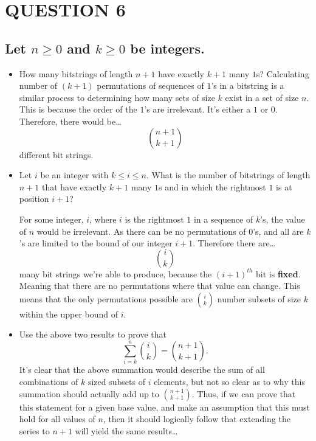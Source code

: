 \documentclass{amsart}
\theoremstyle{definition}
\theoremstyle{remark}
\numberwithin{equation}{section}
\begin{document}
\section*{QUESTION 6}
\subsection*{
Let $n \geq 0$ and $k \geq 0$ be integers. 
}
\begin{itemize} 
\item How many bitstrings of length $n+1$ have exactly $k+1$ many $1$s? \newline\newline 
	Calculating number of $(k+1)$ permutations of sequences of $1$'s in a bitstring is a similar process to determining how many sets of size $k$ exist in a set of size $n$. 
	This is because the order of the $1$'s are irrelevant. It's either a $1$ or $0$. Therefore, there would be\dots\newline $${n+1}\choose {k+1}$$ different bit strings.\newline
\item Let $i$ be an integer with $k \leq i \leq n$.  
      What is the number of bitstrings of length $n+1$ that have exactly 
      $k+1$ many $1$s and in which the rightmost $1$ is at position $i+1$? \newline\newline
      
      For some integer, $i$, where $i$ is the rightmost $1$ in a sequence of $k$'s, the value of $n$ would be irrelevant. As there can be no permutations of $0$'s, and all are $k$'s are limited to the bound of our integer $i + 1$. Therefore there are\dots$${i\choose k}$$\newline many bit strings we're able to produce, because the $(i+1)^{th}$ bit is \textbf{fixed}. Meaning that there are no permutations where that value can change. This means that the only permutations possible are ${i\choose k}$ number subsets of size $k$ within the upper bound of $i$.\newline
      
      
\item Use the above two results to prove that 
      \[ \sum_{i=k}^n {i \choose k} = { {n+1} \choose {k+1} } . 
      \] \newline
      It's clear that the above summation would describe the sum of all combinations of $k$ sized subsets of $i$ elements, but not so clear as to why this summation should actually add up to ${n+1 \choose k+1}$. Thus, if we can prove that this statement for a given base value, and make an assumption that this must hold for all values of $n$, then it should logically follow that extending the series to $n+1$ will yield the same results\dots\newline


\end{itemize}
\end{document}
